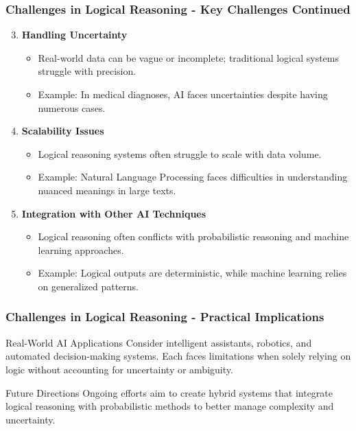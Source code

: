 \documentclass[aspectratio=169]{beamer}
\begin{document}
\begin{frame}[fragile]
    \frametitle{Challenges in Logical Reasoning - Key Challenges Continued}
    \begin{enumerate}
        \setcounter{enumi}{2} %
        \item \textbf{Handling Uncertainty}
        \begin{itemize}
            \item Real-world data can be vague or incomplete; traditional logical systems struggle with precision.
            \item Example: In medical diagnoses, AI faces uncertainties despite having numerous cases.
        \end{itemize}

        \item \textbf{Scalability Issues}
        \begin{itemize}
            \item Logical reasoning systems often struggle to scale with data volume.
            \item Example: Natural Language Processing faces difficulties in understanding nuanced meanings in large texts.
        \end{itemize}

        \item \textbf{Integration with Other AI Techniques}
        \begin{itemize}
            \item Logical reasoning often conflicts with probabilistic reasoning and machine learning approaches.
            \item Example: Logical outputs are deterministic, while machine learning relies on generalized patterns.
        \end{itemize}
    \end{enumerate}
\end{frame}

\begin{frame}[fragile]
    \frametitle{Challenges in Logical Reasoning - Practical Implications}
    \begin{block}{Real-World AI Applications}
        Consider intelligent assistants, robotics, and automated decision-making systems. Each faces limitations when solely relying on logic without accounting for uncertainty or ambiguity.
    \end{block}

    \begin{block}{Future Directions}
        Ongoing efforts aim to create hybrid systems that integrate logical reasoning with probabilistic methods to better manage complexity and uncertainty.
    \end{block}
\end{frame}
\end{document}
